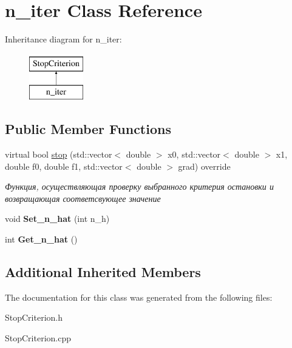 \hypertarget{classn__iter}{}\section{n\+\_\+iter Class Reference}
\label{classn__iter}
Inheritance diagram for n\+\_\+iter\+:\begin{figure}[H]
\begin{center}
\leavevmode
\includegraphics[height=2.000000cm]{classn__iter}
\end{center}
\end{figure}
\subsection*{Public Member Functions}
\begin{DoxyCompactItemize}
\item 
\mbox{\label{classn__iter_a502ced9e4fb5b198b7f8d8795e610333}} 
virtual bool \mbox{\hyperlink{classn__iter_a502ced9e4fb5b198b7f8d8795e610333}{stop}} (std\+::vector$<$ double $>$ x0, std\+::vector$<$ double $>$ x1, double f0, double f1, std\+::vector$<$ double $>$ grad) override
\begin{DoxyCompactList}\small\item\em Функция, осуществляющая проверку выбранного критерия остановки и возвращающая соответсвующее значение \end{DoxyCompactList}\item 
\mbox{\label{classn__iter_ac2024d74a52c99318dfe07fb8cf6f359}} 
void {\bfseries Set\+\_\+n\+\_\+hat} (int n\+\_\+h)
\item 
\mbox{\label{classn__iter_a5488180741dd37985389bc9d83760279}} 
int {\bfseries Get\+\_\+n\+\_\+hat} ()
\end{DoxyCompactItemize}
\subsection*{Additional Inherited Members}


The documentation for this class was generated from the following files\+:\begin{DoxyCompactItemize}
\item 
Stop\+Criterion.\+h\item 
Stop\+Criterion.\+cpp\end{DoxyCompactItemize}
